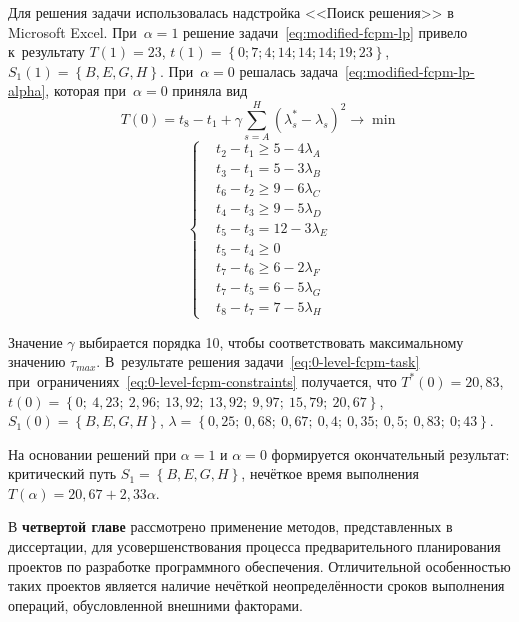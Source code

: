 Для решения задачи использовалась надстройка <<Поиск решения>> в Microsoft Excel. При~$\alpha=1$ решение задачи~\eqref{eq:modified-fcpm-lp} привело к~результату $T\left( 1 \right)=23$, $t\left( 1 \right)=\left\{ 0;7;4;14;14;14;19;23 \right\}$, $S_1\left( 1 \right)=\left\{ B,E,G,H \right\}$. При~$\alpha=0$ решалась задача~\eqref{eq:modified-fcpm-lp-alpha}, которая при~$\alpha=0$ приняла вид
\begin{equation}
\label{eq:0-level-fcpm-task}
  T\left( 0 \right)=t_8-t_1+\gamma \sum\limits_{s=A}^{H}\left( \lambda_{s}^{*}-\lambda_s \right)^{2}\to \min
\end{equation}
\begin{equation}
\label{eq:0-level-fcpm-constraints}
  \left\{ \begin{aligned}
    & t_2-t_1 \geqslant 5-4\lambda_A \\ 
    & t_3-t_1=5-3\lambda_B \\ 
    & t_6-t_2 \geqslant 9-6\lambda_C \\ 
    & t_4-t_3 \geqslant 9-5\lambda_D \\ 
    & t_5-t_3=12-3\lambda_E \\ 
    & t_5-t_4 \geqslant 0 \\ 
    & t_7-t_6 \geqslant 6-2\lambda_F \\ 
    & t_7-t_5=6-5\lambda_G \\ 
    & t_8-t_7=7-5\lambda_H
  \end{aligned} \right.
\end{equation}

Значение $\gamma$ выбирается порядка 10, чтобы соответствовать максимальному значению $\tau_{max}$. В~результате решения задачи~\eqref{eq:0-level-fcpm-task} при~ограничениях~\eqref{eq:0-level-fcpm-constraints} получается, что $T^*\left( 0 \right)=20,83$, $t\left(0\right)=\left\{ 0;\ 4,23;\ 2,96;\ 13,92;\ 13,92;\ 9,97;\ 15,79;\ 20,67 \right\}$, $S_1\left( 0 \right)=\left\{ B,E,G,H \right\}$, $\lambda =\left\{ 0,25;\ 0,68;\ 0,67;\ 0,4;\ 0,35;\ 0,5;\ 0,83;\ 0;43 \right\}$.

На основании решений при $\alpha=1$ и $\alpha=0$ формируется окончательный результат: критический путь $S_1=\left\{ B,E,G,H \right\}$, нечёткое время выполнения $T\left( \alpha \right)=20,67+2,33\alpha$.

В \textbf{четвертой главе} рассмотрено применение методов, представленных в диссертации, для усовершенствования процесса предварительного планирования проектов по разработке программного обеспечения. Отличительной особенностью таких проектов является наличие нечёткой неопределённости сроков выполнения операций, обусловленной внешними факторами. 

